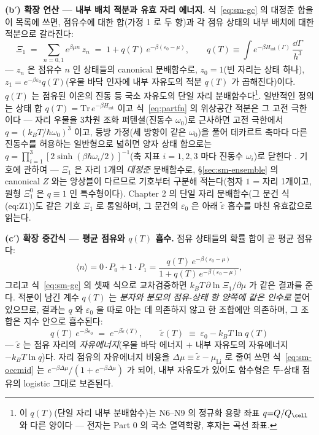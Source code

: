\textbf{(b$'$) 확장 연산 --- 내부 배치 적분과 유효 자리 에너지.} 식~\eqref{eq:sm-gc} 의 대정준 합을 이
목록에 쓰면, 점유수에 대한 합(가정 1 로 두 항)과 각 점유 상태의 내부 배치에 대한 적분으로 갈라진다:
\begin{equation}
\Xi_1\;=\;\sum_{n=0,1}e^{\beta\mu n}\,z_n
\;=\;1+q(T)\,e^{-\beta(\varepsilon_0-\mu)},
\qquad
q(T)\equiv\int e^{-\beta H_\mathrm{int}(\Gamma)}\,\frac{\dd\Gamma}{h^3}
\label{eq:partfn}
\end{equation}
--- $z_n$ 은 점유수 $n$ 인 상태들의 canonical 분배함수로, $z_0=1$(빈 자리는 상태 하나),
$z_1=e^{-\beta\varepsilon_0}q(T)$(우물 바닥 인자에 내부 자유도의 적분 $q(T)$ 가 곱해진다)이다. $q(T)$ 는
점유된 이온의 진동 등 국소 자유도의 단일 자리 분배함수다\footnote{이 $q(T)$(단일 자리 내부 분배함수)는 N6--N9 의 정규화 용량 좌표 $q{=}Q/Q_\cell$ 와 다른 양이다 --- 전자는 Part 0 의 국소 열역학량, 후자는 곡선 좌표.}. 일반적인 정의는
상태 합 $q(T)=\mathrm{Tr}\,e^{-\beta H_\mathrm{int}}$ 이고 식~\eqref{eq:partfn} 의 위상공간 적분은 그 고전
극한이다 --- 자리 우물을 3차원 조화 퍼텐셜(진동수 $\omega_0$)로 근사하면 고전 극한에서
$q=(k_BT/\hbar\omega_0)^3$ 이고, 등방 가정(세 방향이 같은 $\omega_0$)을 풀어 데카르트 축마다 다른 진동수를
허용하는 일반형으로 넓히면 양자 상태 합으로는 $q=\prod_{i=1}^{3}[2\sinh(\beta\hbar\omega_i/2)]^{-1}$(축 지표
$i=1,2,3$ 마다 진동수 $\omega_i$)로 닫힌다 \cite{mcquarrie1976}. 기호에 관하여 --- $\Xi_1$ 은 자리 1개의
\emph{대정준} 분배함수로, \S\ref{sec:sm-ensemble} 의 canonical $Z$ 와는 앙상블이 다르므로 기호부터 구분해
적는다(첨자 $1$ = 자리 1개이고, 원형 $\Xi_1^{0}$ 은 $q\equiv1$ 인 특수형이다). Chapter 2 의 단일 자리
분배함수(그 문건 식 (eq:Z1))도 같은 기호 $\Xi_1$ 로 통일하며, 그 문건의 $\varepsilon_0$ 은 아래
$\tilde\varepsilon$ 흡수를 마친 유효값으로 읽는다.

\textbf{(c$'$) 확장 중간식 --- 평균 점유와 $q(T)$ 흡수.} 점유 상태들의 확률 합이 곧 평균 점유다:
\begin{equation}
\langle n\rangle=0\cdot P_0+1\cdot P_1
=\frac{q(T)\,e^{-\beta(\varepsilon_0-\mu)}}{1+q(T)\,e^{-\beta(\varepsilon_0-\mu)}},
\label{eq:sm-occmid}
\end{equation}
그리고 식~\eqref{eq:sm-gc} 의 셋째 식으로 교차검증하면 $k_BT\,\partial\ln\Xi_1/\partial\mu$ 가 같은 결과를
준다. 적분이 남긴 계수 $q(T)$ 는 \emph{분자와 분모의 점유-상태 항 양쪽에 같은 인수로} 붙어 있으므로, 결과는
$q$ 와 $\varepsilon_0$ 을 따로 아는 데 의존하지 않고 한 조합에만 의존하며, 그 조합은 지수 안으로 흡수된다:
\begin{equation}
q(T)\,e^{-\beta\varepsilon_0}\;=\;e^{-\beta\tilde\varepsilon(T)},
\qquad
\tilde\varepsilon(T)\;\equiv\;\varepsilon_0-k_BT\ln q(T)
\label{eq:sm-epstilde}
\end{equation}
--- $\tilde\varepsilon$ 는 점유 자리의 \emph{자유에너지}(우물 바닥 에너지 $+$ 내부 자유도의 자유에너지
$-k_BT\ln q$)다. 자리 점유의 자유에너지 비용을 $\Delta\mu\equiv\tilde\varepsilon-\mu_\mathrm{Li}$ 로 줄여
쓰면 식~\eqref{eq:sm-occmid} 는 $e^{-\beta\Delta\mu}/(1+e^{-\beta\Delta\mu})$ 가 되어, 내부 자유도가 있어도
함수형은 두-상태 점유의 logistic 그대로 보존된다.

